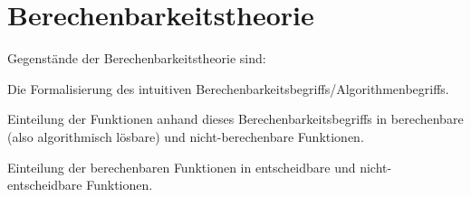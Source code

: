\documentclass{scrartcl}
\begin{document}
\section{Berechenbarkeitstheorie}

Gegenstände der Berechenbarkeitstheorie sind:
\begin{enumerate*}
\item\label{it:Berechenbarkeitsbegriff} 
	Die Formalisierung des intuitiven Berechenbarkeitsbegriffs/Algorithmenbegriffs.
\item\label{it:Einteilung} 
	Einteilung der Funktionen anhand dieses Berechenbarkeitsbegriffs in 
	berechenbare (also algorithmisch lösbare) und nicht-berechenbare Funktionen.
\item\label{it:Entscheidbarkeit} 
	Einteilung der berechenbaren Funktionen in entscheidbare und 
	nicht-entscheidbare Funktionen.
\end{enumerate*}

\end{document}
